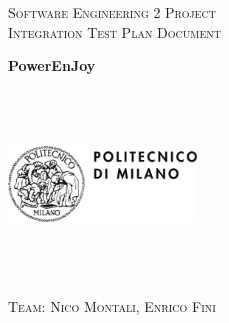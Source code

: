 \documentclass[a4paper,12pt,oneside]{book}
\begin{document}
	
	\pagestyle{empty}\centering
	\textsc{\Large Software Engineering 2 Project\\}
	\textsc{Integration Test Plan Document}

	\vfill

	\textbf{\Huge PowerEnJoy}
	
	\vfill
	\begin{center}	
	\includegraphics[width=5cm,height=5cm,keepaspectratio]{polimi}
	\end{center}
	\textsc{\Large Team: Nico Montali, Enrico Fini}
	
	{\hypersetup{linkcolor=black}
		\tableofcontents
	}
	
	\clearpage
	
\end{document}
